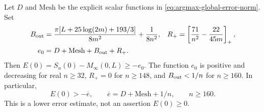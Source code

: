 \begin{lemma}\label{lem:origin-lower}
Let $D$ and $\mathrm{Mesh}$ be the explicit scalar functions in
\eqref{eq:argmax-global-error-norm}. Set
\begin{align*}
 B_{\rm out}&=\frac{\pi[L+25\log(2m)+193/3]}{8m^2}+
                     \frac1{8n^2},&
 R_+&=\left[\frac{71}{n^2}-\frac{22}{45m}\right]_+,\\
 e_0&=D+\mathrm{Mesh}+B_{\rm out}+R_+.
\end{align*}
Then $E(0)=S_n(0)-M_\infty(0,L)\geq-e_0$. The function $e_0$ is
positive and decreasing for real $n\geq32$, $R_+=0$ for $n\geq148$,
and $B_{\rm out}<1/n$ for $n\geq160$. In particular,
\begin{equation}\label{eq:actual-origin-lower}
 E(0)>-\overline e,\qquad \overline e=D+\mathrm{Mesh}+1/n,
                         \qquad n\geq160.
\end{equation}
This is a lower error estimate, not an assertion $E(0)\geq0$.
\end{lemma}
